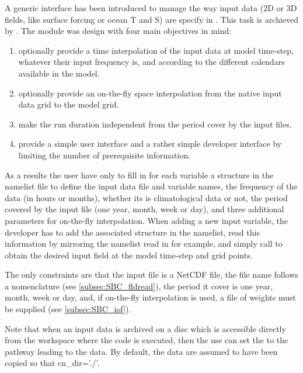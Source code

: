 \documentclass[../main/NEMO_manual]{subfiles}
\begin{document}
A generic interface has been introduced to manage the way input data
(2D or 3D fields, like surface forcing or ocean T and S) are specify in \NEMO.
This task is archieved by .
The module was design with four main objectives in mind: 
\begin{enumerate}
\item
  optionally provide a time interpolation of the input data at model time-step, whatever their input frequency is,
  and according to the different calendars available in the model.
\item
  optionally provide an on-the-fly space interpolation from the native input data grid to the model grid.
\item
  make the run duration independent from the period cover by the input files.
\item
  provide a simple user interface and a rather simple developer interface by
  limiting the number of prerequisite information. 
\end{enumerate}  

As a results the user have only to fill in for each variable a structure in the namelist file to
define the input data file and variable names, the frequency of the data (in hours or months),
whether its is climatological data or not, the period covered by the input file (one year, month, week or day),
and three additional parameters for on-the-fly interpolation.
When adding a new input variable, the developer has to add the associated structure in the namelist,
read this information by mirroring the namelist read in  for example,
and simply call  to obtain the desired input field at the model time-step and grid points.

The only constraints are that the input file is a NetCDF file, the file name follows a nomenclature 
(see \autoref{subsec:SBC_fldread}), the period it cover is one year, month, week or day, and,
if on-the-fly interpolation is used, a file of weights must be supplied (see \autoref{subsec:SBC_iof}).

Note that when an input data is archived on a disc which is accessible directly from the workspace where
the code is executed, then the use can set the  to the pathway leading to the data.
By default, the data are assumed to have been copied so that cn\_dir='./'.

\end{document}
